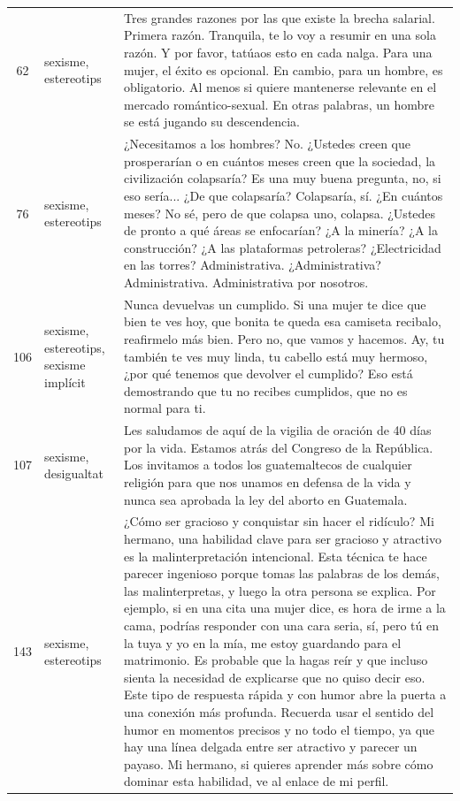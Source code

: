 \begin{longtable}{c>{\raggedright}p{2.0cm}p{12.1cm}}
62 & sexisme, estereotips & Tres grandes razones por las que existe la brecha salarial. Primera razón. Tranquila, te lo voy a resumir en una sola razón. Y por favor, tatúaos esto en cada nalga. Para una mujer, el éxito es opcional. En cambio, para un hombre, es obligatorio. Al menos si quiere mantenerse relevante en el mercado romántico-sexual. En otras palabras, un hombre se está jugando su descendencia. \\
76 & sexisme, estereotips & ¿Necesitamos a los hombres? No. ¿Ustedes creen que prosperarían o en cuántos meses creen que la sociedad, la civilización colapsaría? Es una muy buena pregunta, no, si eso sería... ¿De que colapsaría? Colapsaría, sí. ¿En cuántos meses? No sé, pero de que colapsa uno, colapsa. ¿Ustedes de pronto a qué áreas se enfocarían? ¿A la minería? ¿A la construcción? ¿A las plataformas petroleras? ¿Electricidad en las torres? Administrativa. ¿Administrativa? Administrativa. Administrativa por nosotros. \\
106 & sexisme, estereotips, sexisme implícit & Nunca devuelvas un cumplido. Si una mujer te dice que bien te ves hoy, que bonita te queda esa camiseta recibalo, reafirmelo más bien. Pero no, que vamos y hacemos. Ay, tu también te ves muy linda, tu cabello está muy hermoso, ¿por qué tenemos que devolver el cumplido? Eso está demostrando que tu no recibes cumplidos, que no es normal para ti. \\
107 & sexisme, desigualtat & Les saludamos de aquí de la vigilia de oración de 40 días por la vida. Estamos atrás del Congreso de la República. Los invitamos a todos los guatemaltecos de cualquier religión para que nos unamos en defensa de la vida y nunca sea aprobada la ley del aborto en Guatemala. \\
143 & sexisme, estereotips & ¿Cómo ser gracioso y conquistar sin hacer el ridículo? Mi hermano, una habilidad clave para ser gracioso y atractivo es la malinterpretación intencional. Esta técnica te hace parecer ingenioso porque tomas las palabras de los demás, las malinterpretas, y luego la otra persona se explica. Por ejemplo, si en una cita una mujer dice, es hora de irme a la cama, podrías responder con una cara seria, sí, pero tú en la tuya y yo en la mía, me estoy guardando para el matrimonio. Es probable que la hagas reír y que incluso sienta la necesidad de explicarse que no quiso decir eso. Este tipo de respuesta rápida y con humor abre la puerta a una conexión más profunda. Recuerda usar el sentido del humor en momentos precisos y no todo el tiempo, ya que hay una línea delgada entre ser atractivo y parecer un payaso. Mi hermano, si quieres aprender más sobre cómo dominar esta habilidad, ve al enlace de mi perfil. \\

\end{longtable}
